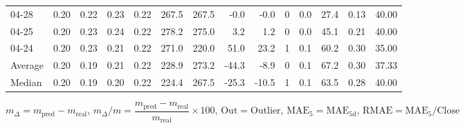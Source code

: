 \begin{threeparttable}
{\begin{tabular}{lrrrrrrrrrrrrr}
  04-28 &          0.20 &          0.22 &          0.23 &        0.22 &               267.5 &               267.5 &       -0.0 &         -0.0 &              0 &                 0.0 &             27.4 &            0.13 &                  40.00 \\
  04-25 &          0.20 &          0.23 &          0.24 &        0.22 &               278.2 &               275.0 &        3.2 &          1.2 &              0 &                 0.0 &             45.1 &            0.21 &                  40.00 \\
  04-24 &          0.20 &          0.23 &          0.21 &        0.22 &               271.0 &               220.0 &       51.0 &         23.2 &              1 &                 0.1 &             60.2 &            0.30 &                  35.00 \\
Average &          0.20 &          0.19 &          0.21 &        0.22 &               228.9 &               273.2 &      -44.3 &         -8.9 &              0 &                 0.1 &             67.2 &            0.30 &                  37.33 \\
 Median &          0.20 &          0.19 &          0.20 &        0.22 &               224.4 &               267.5 &      -25.3 &        -10.5 &              1 &                 0.1 &             63.5 &            0.28 &                  40.00 \\
\bottomrule
\end{tabular}
}
\begin{tablenotes}\footnotesize
\item $m_\Delta=m_{\text{pred}}-m_{\text{real}}$,
$m_\Delta/m=\dfrac{m_{\text{pred}}-m_{\text{real}}}{m_{\text{real}}}\times100$,
$\mathrm{Out}=\text{Outlier}$,
$\mathrm{MAE}_5=\mathrm{MAE}_{5\text{d}}$,
$\mathrm{RMAE}=\mathrm{MAE}_5/\text{Close}$
\end{tablenotes}
\end{threeparttable}
\endgroup

